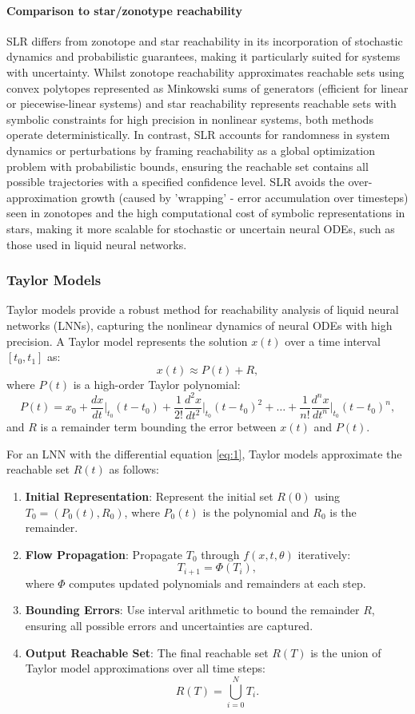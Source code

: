 \paragraph{Comparison to star/zonotype reachability}
SLR differs from zonotope and star reachability in its incorporation of stochastic dynamics and probabilistic guarantees, making it particularly suited for systems with uncertainty. Whilst zonotope reachability approximates reachable sets using convex polytopes represented as Minkowski sums of generators (efficient for linear or piecewise-linear systems) and star reachability represents reachable sets with symbolic constraints for high precision in nonlinear systems, both methods operate deterministically. In contrast, SLR accounts for randomness in system dynamics or perturbations by framing reachability as a global optimization problem with probabilistic bounds, ensuring the reachable set contains all possible trajectories with a specified confidence level. SLR avoids the over-approximation growth (caused by 'wrapping' - error accumulation over timesteps) seen in zonotopes and the high computational cost of symbolic representations in stars, making it more scalable for stochastic or uncertain neural ODEs, such as those used in liquid neural networks. \cite{grunbacherVerificationNeuralODEs2021}

\subsubsection{Taylor Models}

Taylor models provide a robust method for reachability analysis of liquid neural networks (LNNs), capturing the nonlinear dynamics of neural ODEs with high precision. A Taylor model represents the solution \(x(t)\) over a time interval \([t_0, t_1]\) as:
\[
x(t) \approx P(t) + R,
\]
where \(P(t)\) is a high-order Taylor polynomial:
\[
P(t) = x_0 + \frac{dx}{dt}\bigg|_{t_0} (t - t_0) + \frac{1}{2!} \frac{d^2x}{dt^2}\bigg|_{t_0} (t - t_0)^2 + \dots + \frac{1}{n!} \frac{d^n x}{dt^n}\bigg|_{t_0} (t - t_0)^n,
\]
and \(R\) is a remainder term bounding the error between \(x(t)\) and \(P(t)\).

For an LNN with the differential equation \ref{eq:1}, Taylor models approximate the reachable set \(R(t)\) as follows:
\begin{enumerate}
    \item \textbf{Initial Representation}: Represent the initial set \(R(0)\) using \(T_0 = (P_0(t), R_0)\), where \(P_0(t)\) is the polynomial and \(R_0\) is the remainder.
    \item \textbf{Flow Propagation}: Propagate \(T_0\) through \(f(x, t, \theta)\) iteratively:
    \[
    T_{i+1} = \Phi(T_i),
    \]
    where \(\Phi\) computes updated polynomials and remainders at each step.
    \item \textbf{Bounding Errors}: Use interval arithmetic to bound the remainder \(R\), ensuring all possible errors and uncertainties are captured.
    \item \textbf{Output Reachable Set}: The final reachable set \(R(T)\) is the union of Taylor model approximations over all time steps:
    \[
    R(T) = \bigcup_{i=0}^N T_i.
    \]
\end{enumerate}

